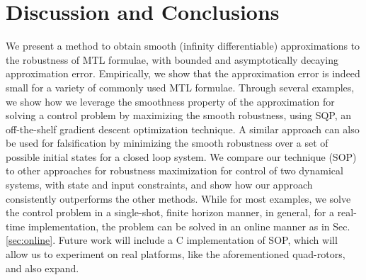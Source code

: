 \section{Discussion and Conclusions}


We present a method to obtain smooth (infinity differentiable) approximations to the robustness of MTL formulae, with bounded and asymptotically decaying approximation error. 
Empirically, we show that the approximation error is indeed small for a variety of commonly used MTL formulae. 
Through several examples, we show how we leverage the smoothness property of the approximation for solving a control problem by maximizing the smooth robustness, using SQP, an off-the-shelf gradient descent optimization technique. A similar approach can also be used for falsification by minimizing the smooth robustness over a set of possible initial states for a closed loop system. We compare our technique (SOP) to other approaches for robustness maximization for control of two dynamical systems, with state and input constraints, and show how our approach consistently outperforms the other methods. 
While for most examples, we solve the control problem in a single-shot, finite horizon manner, in general, for a real-time implementation, the problem can be solved in an online manner as in Sec. \ref{sec:online}.
Future work will include a C implementation of SOP, which will allow us to experiment on real platforms, like the aforementioned quad-rotors, and also expand.


